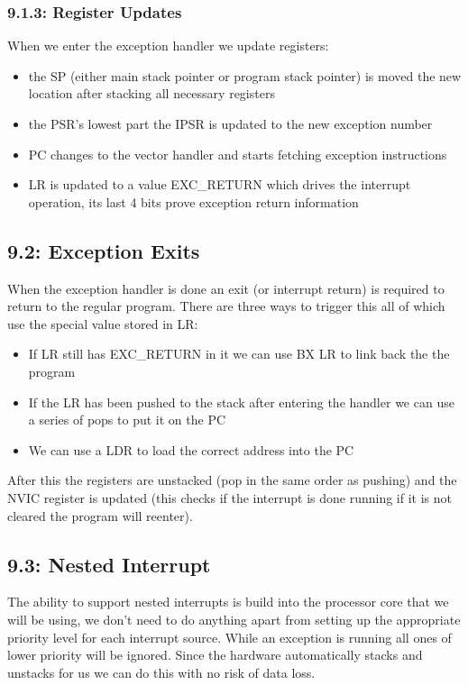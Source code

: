 \documentclass[12pt]{article}
\begin{document}
\subsubsection*{9.1.3: Register Updates}
When we enter the exception handler we update registers:
\begin{itemize}
    \item the SP (either main stack pointer or program stack pointer) is moved the new location after stacking all necessary registers
    \item the PSR's lowest part the IPSR is updated to the new exception number
    \item PC changes to the vector handler and starts fetching exception instructions
    \item LR is updated to a value EXC\_RETURN which drives the interrupt operation, its last 4 bits prove exception return information
\end{itemize}

\subsection*{9.2: Exception Exits}
When the exception handler is done an exit (or interrupt return) is required to return to the regular program. There are three ways to trigger this all of which use the special value stored in LR:
\begin{itemize}
    \item If LR still has EXC\_RETURN in it we can use BX LR to link back the the program
    \item If the LR has been pushed to the stack after entering the handler we can use a series of pops to put it on the PC
    \item We can use a LDR to load the correct address into the PC
\end{itemize}
After this the registers are unstacked (pop in the same order as pushing) and the NVIC register is updated (this checks if the interrupt is done running if it is not cleared the program will reenter).

\subsection*{9.3: Nested Interrupt}
The ability to support nested interrupts is build into the processor core that we will be using, we don't need to do anything apart from setting up the appropriate priority level for each interrupt source. While an exception is running all ones of lower priority will be ignored. Since the hardware automatically stacks and unstacks for us we can do this with no risk of data loss.
\end{document}
